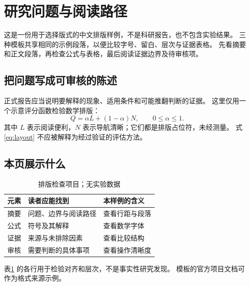 \section{研究问题与阅读路径}
这是一份用于选择版式的中文排版样例，不是科研报告，也不包含实验结果。
三种模板共享相同的示例段落，以便比较字号、留白、层次与证据表格。
先看摘要和正文段落，再检查公式与表格，最后阅读证据边界及待审核项。

\subsection{把问题写成可审核的陈述}
正式报告应当说明要解释的现象、适用条件和可能推翻判断的证据。
这里仅用一个示意评分函数检验数学排版：
\begin{equation}\label{eq:layout}
 Q = \alpha L + (1-\alpha)N, \qquad 0\leq\alpha\leq1 .
\end{equation}
其中 $L$ 表示阅读便利，$N$ 表示导航清晰；它们都是排版占位符，未经测量。
式\eqref{eq:layout} 不应被解释为经过验证的评估方法。

\subsection{本页展示什么}
\begin{table}[htbp]
\centering
\caption{排版检查项目；无实验数据}\label{tab:checks}
\begin{tabular}{lll}
\toprule
元素 & 读者应能找到 & 本样例的含义\\
\midrule
摘要 & 问题、边界与阅读路径 & 查看行距与段落\\
公式 & 符号及其解释 & 查看数学字体\\
证据 & 来源与未排除因素 & 查看比较结构\\
审核 & 需要判断的具体事项 & 查看操作清晰度\\
\bottomrule
\end{tabular}
\end{table}

表\ref{tab:checks} 的各行用于检验对齐和层次，不是事实性研究发现。
模板的官方项目文档可作为格式来源示例\cite{elegantpaper,elegantnote,elegantbook}。
